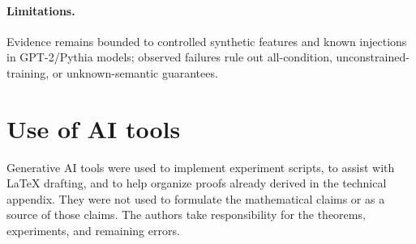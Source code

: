 \documentclass{article}
\theoremstyle{plain}
\begin{document}
\paragraph{Limitations.}
Evidence remains bounded to controlled synthetic features and known injections in GPT-2/Pythia models; observed failures rule out all-condition, unconstrained-training, or unknown-semantic guarantees.

{\footnotesize


}

\section*{Use of AI tools}
Generative AI tools were used to implement experiment scripts, to assist with \LaTeX{} drafting, and to help organize proofs already derived in the technical appendix. They were not used to formulate the mathematical claims or as a source of those claims. The authors take responsibility for the theorems, experiments, and remaining errors.
\end{document}
